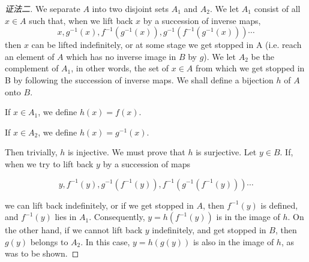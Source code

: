 \documentclass{book}[oneside]
\newtheorem{Def}{定义}[chapter]
\begin{document}
\begin{CJK*}{UTF8}{gbsn}
  \begin{proof}[证法二]
     We separate $A$ into two disjoint sets $A_1$ and $A_2$. We let $A_1$ consist of all $x\in A$ such that, when we lift back $x$ by a succession of inverse maps,
    \[x, g^{-1}(x), f^{-1}(g^{-1}(x)),g^{-1}(f^{-1}(g^{-1}(x)))\cdots\]
    then $x$ can be lifted indefinitely, or  at some stage we get stopped in A (i.e. reach an element of $A$ which has no inverse image in $B$ by $g$). We let $A_2$ be the complement of $A_1$, in other words, the set of $x\in A$ from which we get stopped in B by following the succession of inverse maps. We shall define a bijection $h$ of $A$ onto $B$.

    If $x\in A_1$, we define $h(x)=f(x)$.

    If $x\in A_2$, we define $h(x)=g^{-1}(x)$.

    Then trivially, $h$ is injective. We must prove that $h$ is surjective. Let $y\in B$. If, when we try to lift back $y$ by a succession of maps

    \[y, f^{-1}(y), g^{-1}(f^{-1}(y)),f^{-1}(g^{-1}(f^{-1}(y)))\cdots\]
    
    we can lift back indefinitely, or if we get stopped in $A$, then $f^{-1}(y)$ is defined, and $f^{-1}(y)$ lies in $A_1$. Consequently, $y = h(f^{-1}(y))$ is in the image of $h$. On the other hand, if we cannot lift back $y$ indefinitely, and get stopped in $B$, then $g(y)$ belongs to $A_2$. In this case, $y=h(g(y))$ is also in the image of $h$, as was to be shown.

  \end{proof}



\end{CJK*}
\end{document}
